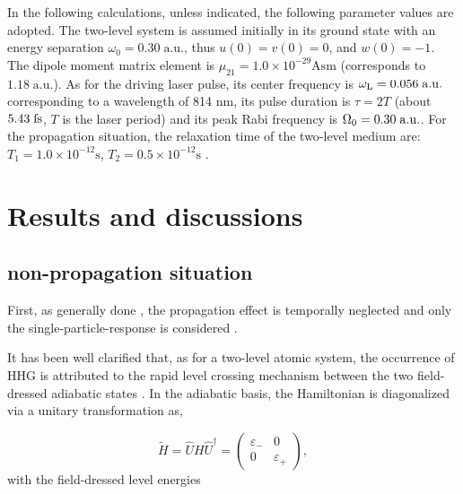 \documentclass[10pt,letterpaper]{article}
\begin{document}
In the following calculations, unless indicated, the following parameter values are adopted.
The two-level system is assumed initially in its ground state with an energy separation $\omega_0=0.30\;\textrm{a.u.}$, thus $ u(0)=v(0)=0 $, and $ w(0)=-1 $. The dipole moment matrix element is $\mu_{21}=1.0\times10^{-29}\textrm{Asm}$ (corresponds to $1.18\;\textrm{a.u.}$). As for the driving laser pulse, its center frequency is $ \omega_{\rm{L}}=0.056\;\rm{a.u.}$ corresponding to a wavelength of 814 nm, its pulse duration is $\tau=2T$ (about $ 5.43\;\rm{fs} $, $T$ is the laser period) and its peak Rabi frequency is $ \Omega_{0}=0.30\;\rm{a.u.} $. For the propagation situation, the relaxation time of the two-level medium are: $ T_{1}=1.0\times10^{-12} \textrm{s} $, $ T_{2}=0.5\times10^{-12} \textrm{s} $ \cite{Kalosha-Two-Level-PRL-1999}. 
\section{Results and discussions}
\subsection{non-propagation situation}
First, as generally done \cite{CuiNi2010NJP-wavelet,Faria-Two-Level-Three-Step-PRA-2002,Gauthey-Early-Two-Level-PRA-1997,Gong-Two-Level-Two-Color-JMO-1999,Kaplan-Early-Two-Level-PRA-1994,LiuChengpu-Two-Level-PRA-2004,YangWeifeng-Two-Level-PLA-2007,ZengZhinan-Two-Color-PRL-2007,WANG-ZHONG-YANG-Two-Level-Attosecond-generation-1999}, the propagation effect is temporally neglected and only the single-particle-response is considered . 

It has been well clarified that, as for a two-level atomic system, the occurrence of HHG is attributed to the rapid level crossing mechanism between the two field-dressed adiabatic states  \cite{Gauthey-Early-Two-Level-PRA-1997}. In the adiabatic basis, the Hamiltonian is diagonalized via a unitary transformation as,

\begin{equation}
\tilde H = \hat UH{\hat U^\dag } = \left( {\begin{array}{*{20}{c}}
	{{\varepsilon _ - }}&0\\
	0&{{\varepsilon _ + }}
	\end{array}} \right),
\label{eq14}
\end{equation}
with the field-dressed level energies \cite{YangWeifeng-Two-Level-PLA-2007}
\end{document}
